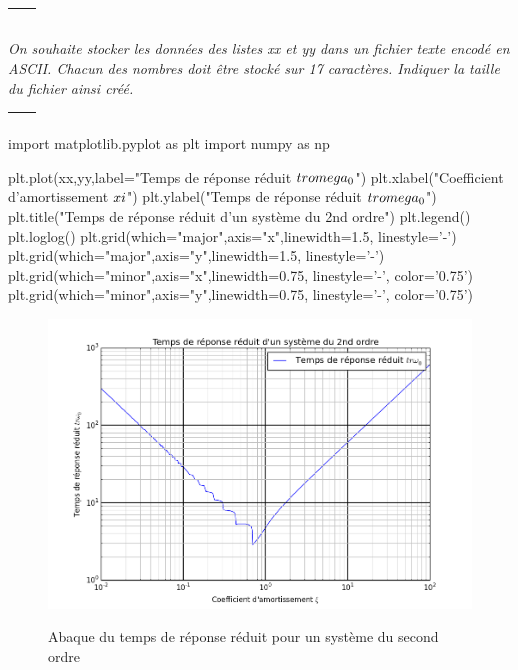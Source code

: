 \documentclass[10pt]{article}
\newif\ifprof
\begin{document}
\begin{tabular}{|p{}|}
\hline
$$\quad$$
\vspace{6cm}
$$\quad$$ \\
\hline
\end{tabular}

\fi

\subparagraph{}
\textit{On souhaite stocker les données des listes \textsf{xx} et \textsf{yy} dans un fichier texte encodé en ASCII. Chacun des nombres doit être stocké sur 17 caractères. Indiquer la taille du fichier ainsi créé.}
\ifprof
\begin{corrige}
90 valeurs sont calculées pour chaque intervalles de $z$. $xx$ et $yy$ ont donc une taille de 360 éléments. 
En prenant en compte les 34 caractères, l'espace et le retour à la ligne (2 caractères), une ligne a donc une taille de 37 octets. Le fichier sera donc d'approximativement de 13 320 octets.
\end{corrige}
\else

\begin{tabular}{|p{}|}
\hline
$$\quad$$
\vspace{2cm}
$$\quad$$ \\
\hline
\end{tabular}

\fi
\ifprof
\else

\newpage 
\begin{py}
\begin{python}
import matplotlib.pyplot as plt
import numpy as np

plt.plot(xx,yy,label="Temps de réponse réduit $tr \\omega_0$")
plt.xlabel("Coefficient d'amortissement $\\xi$")
plt.ylabel("Temps de réponse réduit $tr \\omega_0$")
plt.title("Temps de réponse réduit d'un système du 2nd ordre")
plt.legend()
plt.loglog()
plt.grid(which="major",axis="x",linewidth=1.5, linestyle='-')
plt.grid(which="major",axis="y",linewidth=1.5, linestyle='-')
plt.grid(which="minor",axis="x",linewidth=0.75, linestyle='-', color='0.75')
plt.grid(which="minor",axis="y",linewidth=0.75, linestyle='-', color='0.75')
\end{python}
\end{py}

\begin{figure}[!ht]
\begin{center}
\includegraphics[width=.8\linewidth]{images/figure_1}

Abaque du temps de réponse réduit pour un système du second ordre \label{ref_aba}
\end{center}
\end{figure}
\fi
\end{document}
